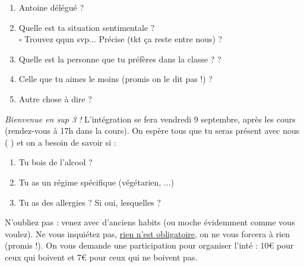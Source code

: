 \begin{enumerate}
        \item Antoine délégué ?  \hfill {} \hfill \makebox[2cm][l]{\color{black!10!white}{$\square$ non}}
        
        \item Quelle est ta situation sentimentale ?  \hfill {} \hfill
         \hfill\text{}\\
         $\square$ Trouvez qqun svp... Précise (tkt ça reste entre nous) ? \enspace\hrulefill\\
        \text{}\enspace\hrulefill
        
        \item Quelle est la personne que tu préfères dans la classe ? \enspace\hrulefill ?
        
        \item Celle que tu aimes le moins (promis on le dit pas !) ? \enspace\hrulefill
        
        \item Autre chose à dire ? \enspace\hrulefill
        
    \end{enumerate}
    
    \text{}\newline
    
    \noindent\textit{\large\EBGaramond Bienvenue en sup 3 !} L'intégration se fera vendredi 9 septembre, après les cours (rendez-vous à 17h dans la cours). On espère tous que tu seras présent avec nous ( ) et on a besoin de savoir si :
    
    \begin{enumerate}
        \item[\ast] Tu bois de l'alcool ?    
        
        \item[\ast] Tu as un régime spécifique (végétarien, ...) \enspace\hrulefill
        
        \item[\ast] Tu as des allergies ? Si oui, lesquelles ? \enspace\hrulefill
    \end{enumerate}
    
    \noindent N'oubliez pas : venez avec d’anciens habits (ou moche évidemment comme vous voulez). Ne vous inquiétez pas, \underline{rien n'est obligatoire}, on ne vous forcera à rien (promis !). On vous demande une participation pour organiser l’inté : 10€ pour ceux qui boivent et 7€ pour ceux qui ne boivent pas.
    
